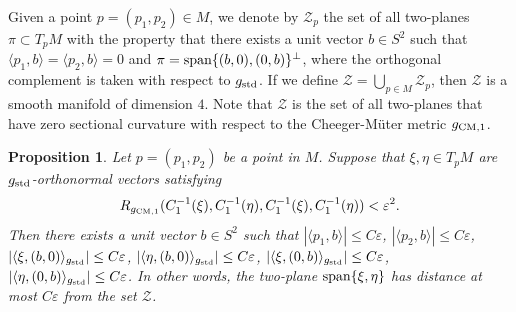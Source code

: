 \documentclass[11pt]{amsart}
\newtheorem{proposition}[theorem]{Proposition}
\theoremstyle{definition}
\begin{document}
Given a point $p = (p_1,p_2) \in M$, we denote by $\mathcal{Z}_p$ the set of all two-planes $\pi \subset T_p M$ with the property that there exists a unit vector $b \in S^2$ such that $\langle p_1,b \rangle = \langle p_2,b \rangle = 0$ and $\pi = \text{\rm span}\{(b,0),(0,b)\}^\perp$, where the orthogonal complement is taken with respect to $g_{\text{\rm std}}$. If we define $\mathcal{Z} = \bigcup_{p \in M} \mathcal{Z}_p$, then $\mathcal{Z}$ is a smooth manifold of dimension $4$. Note that $\mathcal{Z}$ is the set of all two-planes that have zero sectional curvature with respect to the Cheeger-M\"uter metric $g_{\text{\rm CM},1}$.

\begin{proposition} 
\label{lower.bound.for.sectional.curvature.of.Mueter.metrics}
Let $p = (p_1,p_2)$ be a point in $M$. Suppose that $\xi,\eta \in T_p M$ are $g_{\text{\rm std}}$-orthonormal vectors satisfying 
\[R_{g_{\text{\rm CM},1}}(C_1^{-1}(\xi),C_1^{-1}(\eta),C_1^{-1}(\xi),C_1^{-1}(\eta)) < \varepsilon^2.\] 
Then there exists a unit vector $b \in S^2$ such that $|\langle p_1,b \rangle| \leq C\varepsilon$, $|\langle p_2,b \rangle| \leq C\varepsilon$, $|\langle \xi,(b,0) \rangle_{g_{\text{\rm std}}}| \leq C\varepsilon$, $|\langle \eta,(b,0) \rangle_{g_{\text{\rm std}}}| \leq C\varepsilon$, $|\langle \xi,(0,b) \rangle_{g_{\text{\rm std}}}| \leq C\varepsilon$,  $|\langle \eta,(0,b) \rangle_{g_{\text{\rm std}}}| \leq C\varepsilon$. In other words, the two-plane $\text{\rm span}\{\xi,\eta\}$ has distance at most $C\varepsilon$ from the set $\mathcal{Z}$.
\end{proposition}
\end{document}
